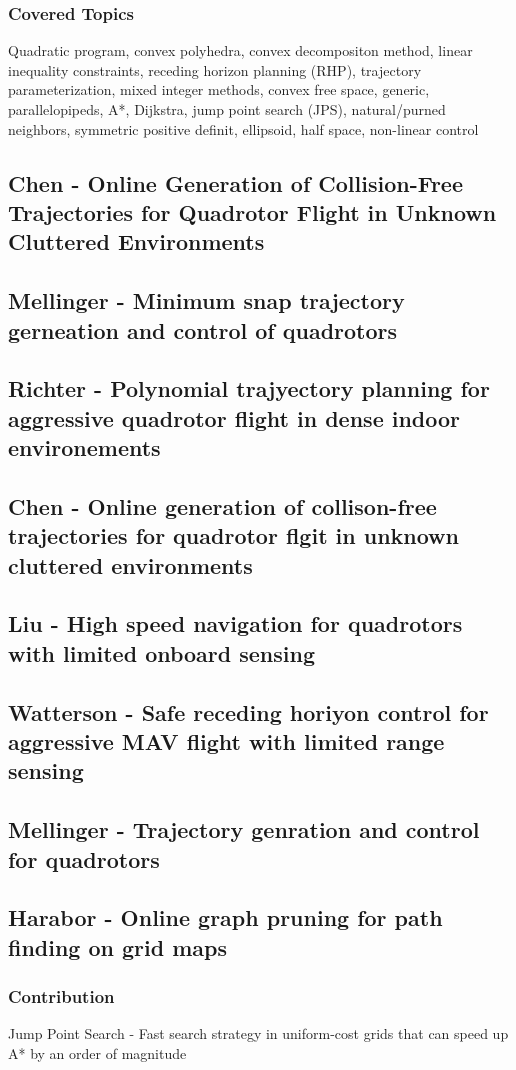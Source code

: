 \subsubsection{Covered Topics}
Quadratic program, convex polyhedra, convex decompositon method, linear inequality constraints, receding horizon planning (RHP), trajectory parameterization, mixed integer methods, convex free space, generic, parallelopipeds, A*, Dijkstra, jump point search (JPS), natural/purned neighbors, symmetric positive definit, ellipsoid, half space, non-linear control


\subsection{Chen - Online Generation of Collision-Free Trajectories for Quadrotor Flight in Unknown Cluttered Environments}

\subsection{Mellinger - Minimum snap trajectory gerneation and control of quadrotors}

\subsection{Richter - Polynomial trajyectory planning for aggressive quadrotor flight in dense indoor environements}

\subsection{Chen - Online generation of collison-free trajectories for quadrotor flgit in unknown cluttered environments}

\subsection{Liu - High speed navigation for quadrotors with limited onboard sensing}

\subsection{Watterson - Safe receding horiyon control for aggressive MAV flight with limited range sensing}

\subsection{Mellinger - Trajectory genration and control for quadrotors}

\subsection{Harabor - Online graph pruning for path finding on grid maps}

\subsubsection{Contribution}
Jump Point Search - Fast search strategy in uniform-cost grids that can speed up A* by an order of magnitude
